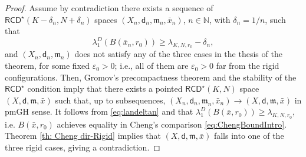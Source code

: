 \documentclass[12pt]{article}
\newcommand{\N}{\mathbb{N}}
\newcommand{\RCD}{\mathsf{RCD}}
\newcommand{\mm}{\mathfrak m}
\newcommand{\di}{\mathsf{d}}
\theoremstyle{plain}
\newtheorem{op}[lemma]{Open Problem}
\theoremstyle{definition}
\begin{document}
\begin{proof}
Assume by contradiction there exists a sequence  of  $\RCD^{\star}(K-\delta_n,N+\delta_n)$ spaces  $(X_n,\di_n,\mm_n,\bar{x}_n)$, $n\in \N$, with $\delta_n=1/n$, such that
\begin{equation}\label{eq:landeltan}
\lambda_1^D(B(\bar{x}_n,r_0))\geq  \lambda_{K,N,r_0}-\delta_n,
\end{equation} 
and $(X_n,\di_n,\mm_n)$ does not satisfy any of the three cases in the thesis of the theorem, for some fixed $\varepsilon_0>0$; i.e.,  all of  them are $\varepsilon_0>0$ far from the rigid configurations. Then, Gromov's precompactness theorem and the stability of the $\RCD^{\star}$ condition imply that there exists a pointed $\RCD^{\star}(K,N)$ space $(X,\di,\mm,\bar{x})$ such that, up to subsequences, $(X_n,\di_n,\mm_n, \bar{x}_n)\to  (X,\di,\mm,\bar{x})$ in pmGH sense. It follows from \eqref{eq:landeltan} and \cite[Lemma 2.10]{AH18} that $\lambda_1^D(B(\bar{x},r_0))\geq  \lambda_{K,N,r_0}$, i.e. $B(\bar{x},r_0)$ achieves equality in Cheng's comparison \eqref{eq:ChengBoundIntro}. Theorem \ref{th: Cheng dir-Rigid} implies that $(X,\di,\mm,\bar{x})$ falls into one of the three rigid cases, giving a contradiction. 
\end{proof}




\end{document}
